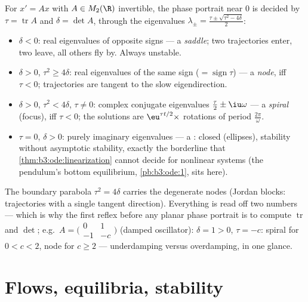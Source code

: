 \begin{example}
\label{ex:b3:ode:planeclassification}
For $x' = Ax$ with $A \in M_2(\R)$ invertible, the phase
portrait near $0$ is decided by $\tau = \operatorname{tr}A$
and $\delta = \det A$, through the eigenvalues $\lambda_\pm
= \frac{\tau \pm \sqrt{\tau^2 - 4\delta}}2$:
\begin{itemize}
  \item $\delta < 0$: real eigenvalues of opposite signs ---
        a \emph{saddle}; two trajectories enter, two leave,
        all others fly by. Always unstable.
  \item $\delta > 0$, $\tau^2 \geq 4\delta$: real eigenvalues
        of the same sign ($= \operatorname{sign}\tau$) --- a
        \emph{node},  iff $\tau < 0$; trajectories are
        tangent to the slow eigendirection.
  \item $\delta > 0$, $\tau^2 < 4\delta$, $\tau \neq 0$:
        complex conjugate eigenvalues $\frac\tau2 \pm
        \iu\omega$ --- a \emph{spiral} (focus),  iff
        $\tau < 0$; the solutions are
        $\eu^{\tau t/2}\times$ rotations of period
        $\frac{2\pi}\omega$.
  \item $\tau = 0$, $\delta > 0$: purely imaginary
        eigenvalues --- a \emph{}: closed 
        (ellipses), stability without asymptotic stability,
        exactly the borderline that
        \cref{thm:b3:ode:linearization} cannot decide for
        nonlinear systems (the pendulum's bottom equilibrium,
        \cref{pb:b3:ode:1}, sits here).
\end{itemize}
The boundary parabola $\tau^2 = 4\delta$ carries the
degenerate nodes (Jordan blocks: trajectories with a single
tangent direction). Everything is read off two numbers ---
which is why the first reflex before any planar phase
portrait is to compute $\operatorname{tr}$ and $\det$; e.g.\
$A = \bigl(\begin{smallmatrix}0 & 1\\ -1 &
-c\end{smallmatrix}\bigr)$ (damped oscillator): $\delta = 1 >
0$, $\tau = -c$:  spiral for $0 < c < 2$,  node
for $c \geq 2$ --- underdamping versus overdamping, in one
glance.
\end{example}

\section{Flows, equilibria, stability}

